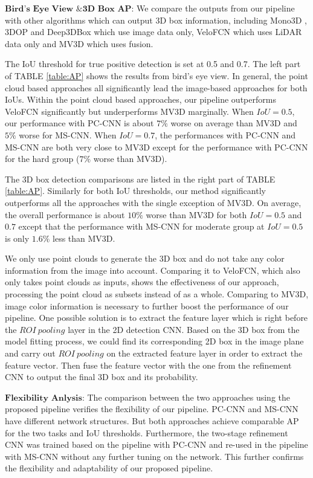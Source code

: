 \documentclass[letterpaper, 10 pt, conference]{ieeeconf}  \usepackage[
\begin{document}
$\textbf{Bird's Eye View \& 3D Box AP:}$ We compare the outputs from our pipeline with other algorithms which can output 3D box information, including Mono3D \cite{chen2016monocular}, 3DOP \cite{xiang2015data} and Deep3DBox \cite{mousavian20163d} which use image data only, VeloFCN \cite{li2016vehicle} which uses LiDAR data only and MV3D \cite{Chen2017CVPR} which uses fusion.

The IoU threshold for true positive detection is set at 0.5 and 0.7. The left part of TABLE \ref{table:AP} shows the results from bird's eye view. In general, the point cloud based approaches all significantly lead the image-based approaches for both IoUs. Within the point cloud based approaches, our pipeline outperforms VeloFCN significantly but underperforms MV3D marginally. When $IoU = 0.5$, our performance with PC-CNN is about $7\%$ worse on average than MV3D and $5\%$ worse for MS-CNN. When $IoU=0.7$, the performances with PC-CNN and MS-CNN are both very close to MV3D except for the performance with PC-CNN for the hard group ($7\%$ worse than MV3D).

The 3D box detection comparisons are listed in the right part of TABLE \ref{table:AP}. Similarly for both IoU thresholds, our method significantly outperforms all the approaches with the single exception of MV3D. On average, the overall performance is about $10\%$ worse than MV3D for both $IoU=0.5$ and $0.7$ except that the performance with MS-CNN for moderate group at $IoU=0.5$ is only $1.6\%$ less than MV3D.

We only use point clouds to generate the 3D box and do not take any color information from the image into account. Comparing it to VeloFCN, which also only takes point clouds as inputs, shows the effectiveness of our approach, processing the point cloud as subsets instead of as a whole. Comparing to MV3D, image color information is necessary to further boost the performance of our pipeline. One possible solution is to extract the feature layer which is right before the $ROI~pooling$ layer in the 2D detection CNN. Based on the 3D box from the model fitting process, we could find its corresponding 2D box in the image plane and carry out $ROI~pooling$ on the extracted feature layer in order to extract the feature vector. Then fuse the feature vector with the one from the refinement CNN to output the final 3D box and its probability.

$\textbf{Flexibility Anlysis:}$ The comparison between the two approaches using the proposed pipeline verifies the flexibility of our pipeline. PC-CNN and MS-CNN have different network structures. But both approaches achieve comparable AP for the two tasks and IoU thresholds. Furthermore, the two-stage refinement CNN was trained based on the pipeline with PC-CNN and re-used in the pipeline with MS-CNN without any further tuning on the network. This further confirms the flexibility and adaptability of our proposed pipeline.
\end{document}
